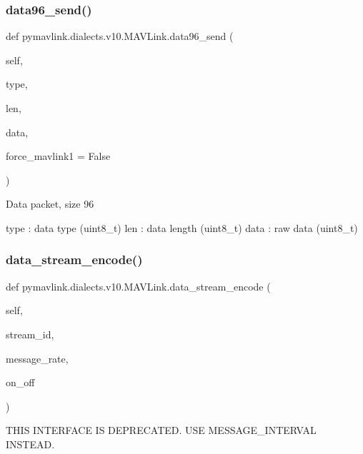 \begin{DoxyVerb}
\begin{DoxyVerb}
\subsubsection{\texorpdfstring{data96\+\_\+send()}{data96\_send()}}
{\footnotesize\ttfamily def pymavlink.\+dialects.\+v10.\+M\+A\+V\+Link.\+data96\+\_\+send (\begin{DoxyParamCaption}\item[{}]{self,  }\item[{}]{type,  }\item[{}]{len,  }\item[{}]{data,  }\item[{}]{force\+\_\+mavlink1 = {\ttfamily False} }\end{DoxyParamCaption})}

\begin{DoxyVerb}Data packet, size 96

type                      : data type (uint8_t)
len                       : data length (uint8_t)
data                      : raw data (uint8_t)\end{DoxyVerb}
 \mbox{\label{classpymavlink_1_1dialects_1_1v10_1_1MAVLink_a8b4c0cb9ff7c0c271602f3690549dff8}} 
\subsubsection{\texorpdfstring{data\+\_\+stream\+\_\+encode()}{data\_stream\_encode()}}
{\footnotesize\ttfamily def pymavlink.\+dialects.\+v10.\+M\+A\+V\+Link.\+data\+\_\+stream\+\_\+encode (\begin{DoxyParamCaption}\item[{}]{self,  }\item[{}]{stream\+\_\+id,  }\item[{}]{message\+\_\+rate,  }\item[{}]{on\+\_\+off }\end{DoxyParamCaption})}

\begin{DoxyVerb}THIS INTERFACE IS DEPRECATED. USE MESSAGE_INTERVAL INSTEAD.


\end{DoxyVerb}
\end{DoxyVerb}
\end{DoxyVerb}
